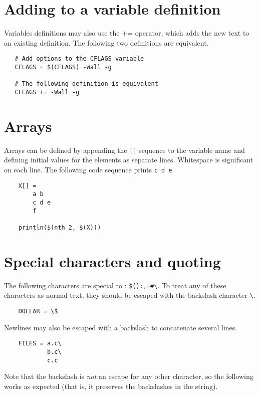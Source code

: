 \section{Adding to a variable definition}

Variables definitions may also use the += operator, which adds the new text to an existing
definition.  The following two definitions are equivalent.

\begin{verbatim}
   # Add options to the CFLAGS variable
   CFLAGS = $(CFLAGS) -Wall -g

   # The following definition is equivalent
   CFLAGS += -Wall -g
\end{verbatim}

\section{Arrays}

Arrays can be defined by appending the \verb+[]+ sequence to the variable name and defining initial
values for the elements as separate lines.  Whitespace is significant on each line.  The following
code sequence prints \verb+c d e+.

\begin{verbatim}
    X[] =
        a b
        c d e
        f

    println($(nth 2, $(X)))
\end{verbatim}

\section{Special characters and quoting}

The following characters are special to : \verb+$():,=#\+.  To treat
any of these characters as normal text, they should be escaped with the backslash
character \verb+\+.

\begin{verbatim}
    DOLLAR = \$
\end{verbatim}

Newlines may also be escaped with a backslash to concatenate several lines.

\begin{verbatim}
    FILES = a.c\
            b.c\
            c.c
\end{verbatim}

Note that the backslash is \emph{not} an escape for any other character, so the following
works as expected (that is, it preserves the backslashes in the string).

